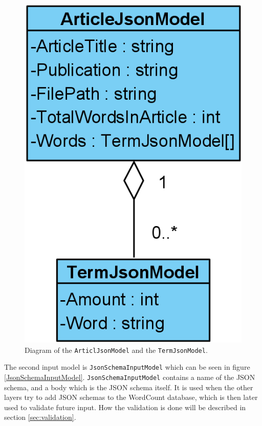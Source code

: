 \begin{figure}[H]
    \centering
    \includegraphics[scale=0.5]{Images/jsonArticleModel.PNG}
    \caption{Diagram of the \texttt{ArticlJsonModel} and the \texttt{TermJsonModel}.}
    \label{ArticlJsonModel}
\end{figure}

The second input model is \texttt{JsonSchemaInputModel} which can be seen in figure \ref*{JsonSchemaInputModel}. \texttt{JsonSchemaInputModel} contains a name of the JSON schema, and a body which is the JSON schema itself. 
It is used when the other layers try to add JSON schemas to the WordCount database, which is then later used to validate future input. 
How the validation is done will be described in section \ref*{sec:validation}.

